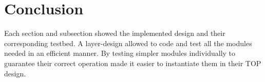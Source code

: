 \documentclass[12pt]{article}
\begin{document}
\section{Conclusion}
Each section and subsection showed the implemented design and their corresponding testbed.  A layer-design allowed to code and test all the modules needed in an efficient manner.  By testing simpler modules individually to guarantee their correct operation made it easier to instantiate them in their TOP design.
\end{document}
